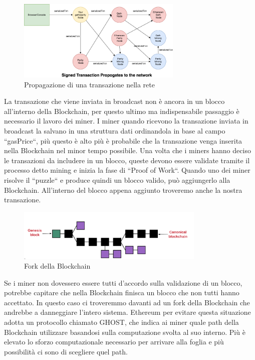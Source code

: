 \documentclass[12pt]{report}
\begin{document}
\begin{figure}[H]
    \centering\includegraphics[width=0.7\textwidth]{broadcast}
    \caption{Propagazione di una transazione nella rete}
\end{figure}


La transazione che viene inviata in broadcast non è ancora in un blocco all'interno della Blockchain, per questo ultimo ma indispensabile passaggio è necessario il lavoro dei miner.
I miner quando ricevono la transazione inviata in broadcast la salvano in una struttura dati ordinandola in base al campo ``gasPrice``, più questo è alto più è probabile che la transazione venga inserita nella Blockchain nel minor tempo possibile.
Una volta che i miners hanno deciso le transazioni da includere in un blocco, queste devono essere validate tramite il processo detto mining e inizia la fase di ``Proof of Work``. Quando uno dei miner risolve il ``puzzle`` e produce quindi un blocco valido, può aggiungerlo alla Blockchain. 
All'interno del blocco appena aggiunto troveremo anche la nostra transazione.
\begin{figure}[H]
    \centering\includegraphics[width=0.8\textwidth]{Fork}
    \caption{Fork della Blockchain}
\end{figure}

Se i miner non dovessero essere tutti d'accordo sulla validazione di un blocco, potrebbe capitare che nella Blockchain finisca un blocco che non tutti hanno accettato. In questo caso ci troveremmo davanti ad un fork della Blockchain che andrebbe a danneggiare l'intero sistema.
Ethereum per evitare questa situazione adotta un protocollo chiamato GHOST, che indica ai miner quale path della Blockchain utilizzare basandosi sulla computazione svolta al suo interno. Più è elevato lo sforzo computazionale necessario per arrivare alla foglia e più possibilità ci sono di scegliere quel path.
\end{document}
